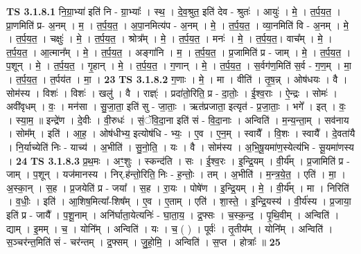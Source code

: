 \documentclass[17pt]{extarticle}
\begin{document}
                                \textbf{ TS 3.1.8.1} \newline
                  नि॒ग्रा॒भ्या॑ इति॑ नि - ग्रा॒भ्याः᳚ । स्थ॒ । दे॒व॒श्रुत॒ इति॑ देव - श्रुतः॑ । आयुः॑ । मे॒ । त॒र्प॒य॒त॒ । प्रा॒णमिति॑ प्र- अ॒नम् । म॒ । त॒र्प॒य॒त॒ । अ॒पा॒नमित्य॑प - अ॒नम् । मे॒ । त॒र्प॒य॒त॒ । व्या॒नमिति॑ वि - अ॒नम् । मे॒ । त॒र्प॒य॒त॒ । चक्षुः॑ । मे॒ । त॒र्प॒य॒त॒ । श्रोत्र᳚म् । मे॒ । त॒र्प॒य॒त॒ । मनः॑ । मे॒ । त॒र्प॒य॒त॒। वाच᳚म् । मे॒ । त॒र्प॒य॒त॒ । आ॒त्मान᳚म् । मे॒ । त॒र्प॒य॒त॒ । अङ्गा॑नि । म॒ । त॒र्प॒य॒त॒ । प्र॒जामिति॑ प्र - जाम् । मे॒ । त॒र्प॒य॒त॒ । प॒शून् । मे॒ । त॒र्प॒य॒त॒ । गृ॒हान् । मे॒ । त॒र्प॒य॒त॒ । ग॒णान् । मे॒ । त॒र्प॒य॒त॒ । स॒र्वग॑ण॒मिति॑ स॒र्व - ग॒ण॒म् । मा॒ । त॒र्प॒य॒त॒ । त॒र्पय॑त । मा॒ । \textbf{  23} \newline
                  \newline
                                \textbf{ TS 3.1.8.2} \newline
                  ग॒णाः । मे॒ । मा । वीति॑ । तृ॒ष॒न्न् । ओष॑धयः । वै । सोम॑स्य । विशः॑ । विशः॑ । खलु॑ । वै । राज्ञ्ः॑ । प्रदा॑तो॒रिति॒ प्र - दा॒तोः॒ । ई॒श्व॒राः । ऐ॒न्द्रः । सोमः॑ । अवी॑वृधम् । वः॒ । मन॑सा । सु॒जा॒ता॒ इति॑ सु - जा॒ताः॒ । ऋत॑प्रजाता॒ इत्यृत॑ - प्र॒जा॒ताः॒ । भगे᳚ । इत् । वः॒ । स्या॒म॒ ॥ इन्द्रे॑ण । दे॒वीः । वी॒रुधः॑ । सं॒ॅवि॒दा॒ना इति॑ सं - वि॒दा॒नाः । अन्विति॑ । म॒न्य॒न्ता॒म् । सव॑नाय । सोम᳚म् । इति॑ । आ॒ह॒ । ओष॑धीभ्य॒ इत्योष॑धि - भ्यः॒ । ए॒व । ए॒न॒म् । स्वायै᳚ । वि॒शः । स्वायै᳚ । दे॒वता॑यै । नि॒र्याच्येति॑ निः - याच्य॑ । अ॒भीति॑ । सु॒नो॒ति॒ । यः । वै । सोम॑स्य । अ॒भि॒षू॒यमा॑ण॒स्येत्य॑भि - सू॒यमा॑णस्य । \textbf{  24} \newline
                  \newline
                                \textbf{ TS 3.1.8.3} \newline
                  प्र॒थ॒मः । अꣳ॒॒शुः । स्कन्द॑ति । सः । ई॒श्व॒रः । इ॒न्द्रि॒यम् । वी॒र्य᳚म् । प्र॒जामिति॑ प्र - जाम् । प॒शून् । यज॑मानस्य । निर्.ह॑न्तो॒रिति॒ निः - ह॒न्तोः॒ । तम् । अ॒भीति॑ । म॒न्त्र॒ये॒त॒ । एति॑ । मा॒ । अ॒स्का॒न् । स॒ह । प्र॒जयेति॑ प्र - जया᳚ । स॒ह । रा॒यः । पोषे॑ण । इ॒न्द्रि॒यम् । मे॒ । वी॒र्य᳚म् । मा । निरिति॑ । व॒धीः॒ । इति॑ । आ॒शिष॒मित्या᳚-शिष᳚म् । ए॒व । ए॒ताम् । एति॑ । शा॒स्ते॒ । इ॒न्द्रि॒यस्य॑ । वी॒र्य॑स्य । प्र॒जाया॒ इति॑ प्र - जायै᳚ । प॒शू॒नाम् । अनि॑र्घाता॒येत्यनिः॑ - घा॒ता॒य॒ । द्र॒फ्सः । च॒स्क॒न्द॒ । पृ॒थि॒वीम् । अन्विति॑ । द्याम् । इ॒मम् । च॒ । योनि᳚म् । अन्विति॑ । यः । च॒ ( ) । पूर्वः॑ । तृ॒तीय᳚म् । योनि᳚म् । अन्विति॑ । स॒ञ्चर॑न्त॒मिति॑ सं - चर॑न्तम् । द्र॒फ्सम् । जु॒हो॒मि॒ । अन्विति॑ । स॒प्त । होत्राः᳚ ॥ \textbf{  25} \newline
\end{document}
